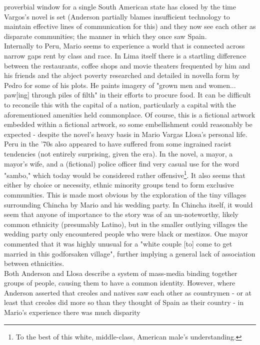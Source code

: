 \documentclass[12pt]{report}
\begin{document}
proverbial window for a single South American state has closed by the time
Vargos's novel is set (Anderson partially blames insufficient technology to
maintain effective lines of communication for this) and they now see each other as
disparate communities; the manner in which they once saw Spain.\\
\indent Internally to Peru, Mario seems to experience a world that is
connected across narrow gaps rent by class and race. In Lima itself there is a startling difference between the
restaurants, coffee shops and movie theaters frequented by him and his
friends and the abject poverty researched and detailed in novella form by
Pedro for some of his plots. He paints imagery of "grown men and women...
paw[ing] through piles of filth" in their efforts to procure food. It can
be difficult to reconcile this with the capital of a nation, particularly a
capital with the aforementioned amenities held commonplace. Of course, this
is a fictional artwork embedded within a fictional artwork, so some
embellishment could reasonably be expected - despite the novel's heavy basis
in Mario Vargas Llosa's personal life.\\
\indent Peru in the '70s also appeared to have suffered from some ingrained
racist tendencies (not entirely surprising, given the era). In the novel,
a mayor, a mayor's wife, and a (fictional) police officer  find very casual
use for the word "sambo," which today would be considered rather
offensive\footnote{To the best of this white, middle-class, American male's
understanding.}. It also seems that either by choice or necessity, ethnic
minority groups tend to form exclusive communities. This is made most
obvious by the exploration of the tiny villages surrounding Chincha by Mario
and his wedding party. In Chincha itself, it would seem that anyone of
importance to the story was of an un-noteworthy, likely common ethnicity
(presumably Latino), but in the smaller outlying villages the wedding party
only encountered people who were black or mestizos. One mayor commented that 
it was highly unusual for a "white couple [to] come to get married in this
godforsaken village"\cite{bib:main}, further implying a general lack of
association between ethnicities.\\
\indent Both Anderson and Llosa describe a system of mass-media binding
together groups of people, causing them to have a common identity. However,
where Anderson asserted that creoles and natives saw each other as
countrymen - or at least that creoles did more so than they thought of Spain
as their country - in Mario's experience there was much disparity
\end{document}
